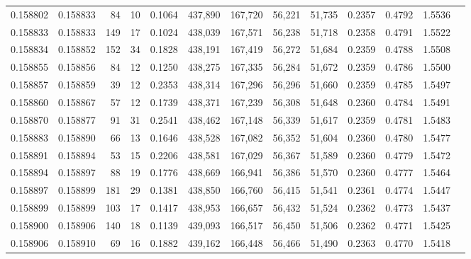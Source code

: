 \begin{tabular}{rrrrrrrrrrrrr}
0.158802 & 0.158833 &    84 &  10 &                                     0.1064 & 437,890 & 167,720 &  56,221 &  51,735 & 0.2357 & 0.4792 & 1.5536 \\
0.158833 & 0.158833 &   149 &  17 &                                     0.1024 & 438,039 & 167,571 &  56,238 &  51,718 & 0.2358 & 0.4791 & 1.5522 \\
0.158834 & 0.158852 &   152 &  34 &                                     0.1828 & 438,191 & 167,419 &  56,272 &  51,684 & 0.2359 & 0.4788 & 1.5508 \\
0.158855 & 0.158856 &    84 &  12 &                                     0.1250 & 438,275 & 167,335 &  56,284 &  51,672 & 0.2359 & 0.4786 & 1.5500 \\
0.158857 & 0.158859 &    39 &  12 &                                     0.2353 & 438,314 & 167,296 &  56,296 &  51,660 & 0.2359 & 0.4785 & 1.5497 \\
0.158860 & 0.158867 &    57 &  12 &                                     0.1739 & 438,371 & 167,239 &  56,308 &  51,648 & 0.2360 & 0.4784 & 1.5491 \\
0.158870 & 0.158877 &    91 &  31 &                                     0.2541 & 438,462 & 167,148 &  56,339 &  51,617 & 0.2359 & 0.4781 & 1.5483 \\
0.158883 & 0.158890 &    66 &  13 &                                     0.1646 & 438,528 & 167,082 &  56,352 &  51,604 & 0.2360 & 0.4780 & 1.5477 \\
0.158891 & 0.158894 &    53 &  15 &                                     0.2206 & 438,581 & 167,029 &  56,367 &  51,589 & 0.2360 & 0.4779 & 1.5472 \\
0.158894 & 0.158897 &    88 &  19 &                                     0.1776 & 438,669 & 166,941 &  56,386 &  51,570 & 0.2360 & 0.4777 & 1.5464 \\
0.158897 & 0.158899 &   181 &  29 &                                     0.1381 & 438,850 & 166,760 &  56,415 &  51,541 & 0.2361 & 0.4774 & 1.5447 \\
0.158899 & 0.158899 &   103 &  17 &                                     0.1417 & 438,953 & 166,657 &  56,432 &  51,524 & 0.2362 & 0.4773 & 1.5437 \\
0.158900 & 0.158906 &   140 &  18 &                                     0.1139 & 439,093 & 166,517 &  56,450 &  51,506 & 0.2362 & 0.4771 & 1.5425 \\
0.158906 & 0.158910 &    69 &  16 &                                     0.1882 & 439,162 & 166,448 &  56,466 &  51,490 & 0.2363 & 0.4770 & 1.5418 \\

\end{tabular}
